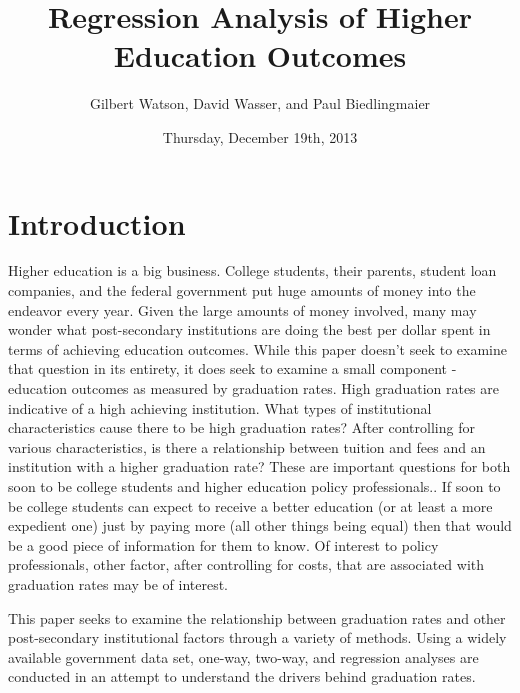 \documentclass{article}
\begin{document}


\title{Regression Analysis of Higher Education Outcomes}
\author{Gilbert Watson, David Wasser, and Paul Biedlingmaier}
\date{Thursday, December 19th, 2013}





\maketitle
\tableofcontents

\section{Introduction}

Higher education is a big business. College students, their parents, student loan companies, and the federal government put huge amounts of money into the endeavor every year. Given the large amounts of money involved, many may wonder what post-secondary institutions are doing the best per dollar spent in terms of achieving education outcomes. While this paper doesn't seek to examine that question in its entirety, it does seek to examine a small component - education outcomes as measured by graduation rates. High graduation rates are indicative of a high achieving institution. What types of institutional characteristics cause there to be high graduation rates? After controlling for various characteristics, is there a relationship between tuition and fees and an institution with a higher graduation rate? These are important questions for both soon to be college students and higher education policy professionals.. If soon to be college students can expect to receive a better education (or at least a more expedient one) just by paying more (all other things being equal) then that would be a good piece of information for them to know. Of interest to policy professionals, other factor, after controlling for costs, that are associated with graduation rates may be of interest.

This paper seeks to examine the relationship between graduation rates and other post-secondary institutional factors through a variety of methods. Using a widely available government data set, one-way, two-way, and regression analyses are conducted  in an attempt to understand the drivers behind graduation rates.
\end{document}
